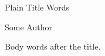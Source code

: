 \documentclass{article}
\begin{document}
\begin{titlepage}
\centering
{\Huge Plain Title Words\par}
\vspace{2em}
{\Large Some Author\par}
\end{titlepage}
Body words after the title.
\end{document}

